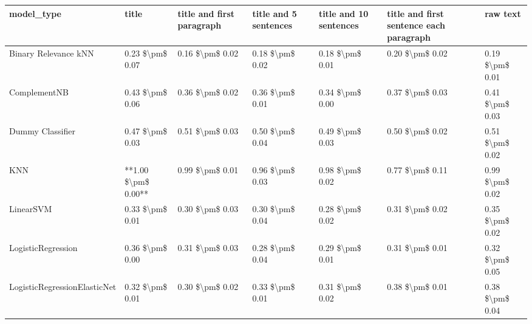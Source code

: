 \begin{tabular}{lllllll}
\toprule
                     model\_type &               title & title and first paragraph & title and 5 sentences & title and 10 sentences & title and first sentence each paragraph &        raw text \\
\midrule
           Binary Relevance kNN &     0.23 \$\textbackslash pm\$ 0.07 &           0.16 \$\textbackslash pm\$ 0.02 &       0.18 \$\textbackslash pm\$ 0.02 &        0.18 \$\textbackslash pm\$ 0.01 &                         0.20 \$\textbackslash pm\$ 0.02 & 0.19 \$\textbackslash pm\$ 0.01 \\
                   ComplementNB &     0.43 \$\textbackslash pm\$ 0.06 &           0.36 \$\textbackslash pm\$ 0.02 &       0.36 \$\textbackslash pm\$ 0.01 &        0.34 \$\textbackslash pm\$ 0.00 &                         0.37 \$\textbackslash pm\$ 0.03 & 0.41 \$\textbackslash pm\$ 0.03 \\
               Dummy Classifier &     0.47 \$\textbackslash pm\$ 0.03 &           0.51 \$\textbackslash pm\$ 0.03 &       0.50 \$\textbackslash pm\$ 0.04 &        0.49 \$\textbackslash pm\$ 0.03 &                         0.50 \$\textbackslash pm\$ 0.02 & 0.51 \$\textbackslash pm\$ 0.02 \\
                            KNN & **1.00 \$\textbackslash pm\$ 0.00** &           0.99 \$\textbackslash pm\$ 0.01 &       0.96 \$\textbackslash pm\$ 0.03 &        0.98 \$\textbackslash pm\$ 0.02 &                         0.77 \$\textbackslash pm\$ 0.11 & 0.99 \$\textbackslash pm\$ 0.02 \\
                      LinearSVM &     0.33 \$\textbackslash pm\$ 0.01 &           0.30 \$\textbackslash pm\$ 0.03 &       0.30 \$\textbackslash pm\$ 0.04 &        0.28 \$\textbackslash pm\$ 0.02 &                         0.31 \$\textbackslash pm\$ 0.02 & 0.35 \$\textbackslash pm\$ 0.02 \\
             LogisticRegression &     0.36 \$\textbackslash pm\$ 0.00 &           0.31 \$\textbackslash pm\$ 0.03 &       0.28 \$\textbackslash pm\$ 0.04 &        0.29 \$\textbackslash pm\$ 0.01 &                         0.31 \$\textbackslash pm\$ 0.01 & 0.32 \$\textbackslash pm\$ 0.05 \\
   LogisticRegressionElasticNet &     0.32 \$\textbackslash pm\$ 0.01 &           0.30 \$\textbackslash pm\$ 0.02 &       0.33 \$\textbackslash pm\$ 0.01 &        0.31 \$\textbackslash pm\$ 0.02 &                         0.38 \$\textbackslash pm\$ 0.01 & 0.38 \$\textbackslash pm\$ 0.04 \\

\end{tabular}

